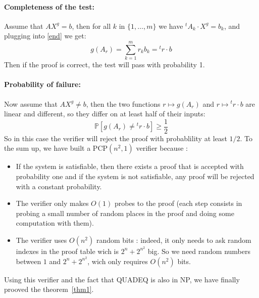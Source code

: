 \documentclass[a4paper,10pt]{article}
\newcommand{\PCP}{\mathrm{PCP}}
\newcommand{\prob}[1]{\mathbb{P}\left[#1\right]}
\theoremstyle{remark}
\begin{document}
\paragraph{Completeness of the test:} Assume that $AX^g = b$, then for all $k$
in $\{1,\ldots,m\}$ we have ${}^tA_k\cdot X^g = b_k$, and plugging into
\eqref{end}
we get:
\begin{displaymath}
g(A_r) = \sum_{k=1}^m r_kb_k = {}^tr\cdot b
\end{displaymath}
Then if the proof is correct, the test will pass with probability 1.

\paragraph{Probability of failure:} Now assume that $AX^g \neq b$, then the two
functions $r\mapsto g(A_r)$ and $r\mapsto {}^tr\cdot b$ are linear and
different, so they differ on at least half of their inputs:
\begin{displaymath}
\prob{g(A_r)\neq {}^tr\cdot b} \geq \frac{1}{2}
\end{displaymath}
So in this case the verifier will reject the proof with probablility at least
$1/2$.
\newpage
To the sum up, we have built a $\PCP(n^2,1)$  verifier because :
\begin{itemize}
\item If the system is satisfiable, then there exists a proof that is accepted
with probability one and if the system is not satisfiable, any proof will be
rejected with a constant probability.
\item The verifier only makes $O(1)$ probes to the proof (each step consists in
probing a small number of random places in the proof and doing some computation
with them).
\item The verifier uses $O(n^2)$ random bits : indeed, it only needs to ask
random indexes in the proof table wich is $2^n+2^{n^2}$ big. So we need random
numbers between $1$ and $2^n+2^{n^2}$, wich only requires $O(n^2)$ bits.
\end{itemize}

Using this verifier and the fact that \textsf{QUADEQ} is also in NP, we have
finally prooved the theorem~\ref{thm1}.
\end{document}
